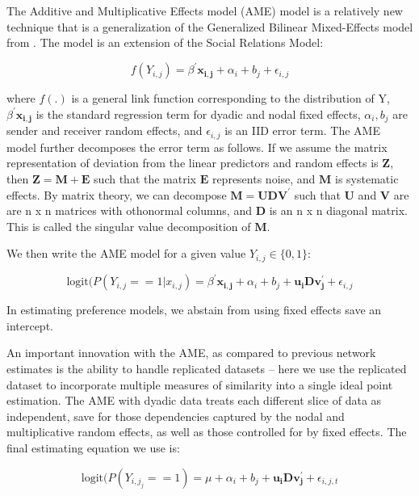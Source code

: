 The Additive and Multiplicative Effects model (AME) model is a relatively new technique that is a generalization of the Generalized Bilinear Mixed-Effects model from \citet{hoff:2005}. The model is an extension of the Social Relations Model: 

\begin{equation}
	f(Y_{i,j}) =  \beta^{'}\mathbf{x_{i,j}} + \alpha_{i} + b_{j} + \epsilon_{i,j}
\end{equation}

where $f(.)$ is a general link function corresponding to the distribution of Y, $\beta^{'}\mathbf{x_{i,j}}$ is the standard regression term for dyadic and nodal fixed effects,  $\alpha_{i}, b_{j}$ are sender and receiver random effects, and $\epsilon_{i,j}$ is an IID error term. The AME model further decomposes the  error term as follows. If we assume the matrix representation of deviation from the linear predictors and random effects is $\mathbf{Z}$, then $\mathbf{Z} = \mathbf{M} + \mathbf{E}$ such that the matrix $\mathbf{E}$ represents noise, and $\mathbf{M}$ is systematic effects. By matrix theory, we can decompose $\mathbf{M} = \mathbf{UDV^{'}}$ such that $\mathbf{U}$ and $\mathbf{V}$ are are n x n matrices with othonormal columns, and $\mathbf{D}$ is an n x n diagonal matrix. This is called the singular value decomposition of $\mathbf{M}$. 

We then write the AME model for a given value $Y_{i,j} \in \{0,1\}$:

\begin{equation}
	\text{logit}(P(Y_{i,j} == 1| x_{i,j}) = \beta^{'}\mathbf{x_{i,j}} + \alpha_{i} + b_{j} + \mathbf{u_{i}Dv^{'}_{j}} + \epsilon_{i,j}
\end{equation}

In estimating preference models, we abstain from using fixed effects save an intercept.

An important innovation with the AME, as compared to previous network estimates is the ability to handle replicated datasets -- here we use the replicated dataset to incorporate multiple measures of similarity into a single ideal point estimation.  The AME with dyadic data treats each different slice of data as independent, save for those dependencies captured by the nodal and multiplicative random effects, as well as those controlled for by fixed effects. The final estimating equation we use is:

\begin{equation}
	\text{logit}(P(Y_{i,j_j} == 1) = \mu + \alpha_{i} + b_{j} + \mathbf{u_{i}Dv^{'}_{j}} + \epsilon_{i,j,t}
\end{equation}

